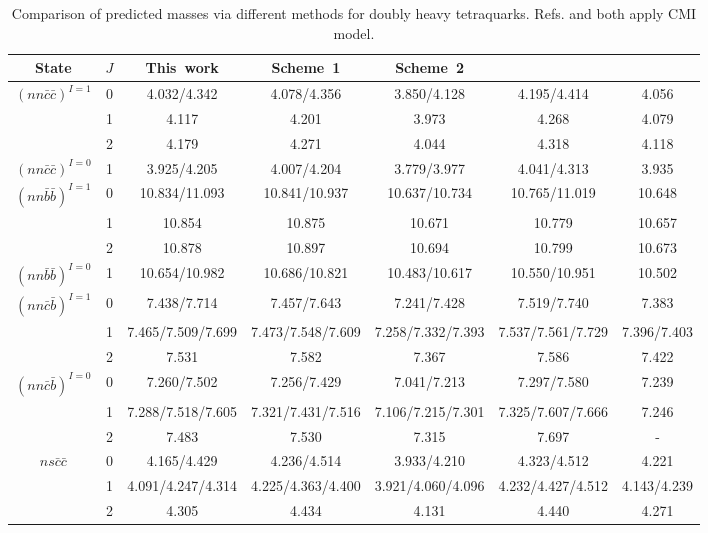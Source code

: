 \documentclass[12pt,onecolumn,floatfix,nofootinbib]{revtex4}
\begin{document}
\renewcommand{\tabcolsep}{0.06cm} \renewcommand{\arraystretch}{1.3}
\begin{table}[!htb]
\caption{Comparison of predicted masses via different methods for doubly heavy
tetraquarks. Refs.\protect\cite{Luo:2017eub} and \protect\cite{Lu:2020rog}
both apply CMI model.}
\label{tab:comparisonT}%
\begin{tabular}{ccccccc}
\hline\hline
\textrm{State} & $J$ & \textrm{This\ work} & \textrm{Scheme\ 1}\cite%
{Luo:2017eub} & \textrm{Scheme\ 2}\cite{Luo:2017eub} & \cite{Lu:2020rog} &
\cite{Ebert:2007rn} \\ \hline
${(nn\bar{c}\bar{c})}^{I=1}$ & 0 & 4.032/4.342 & 4.078/4.356 & 3.850/4.128 &
4.195/4.414 & 4.056 \\
& 1 & 4.117 & 4.201 & 3.973 & 4.268 & 4.079 \\
& 2 & 4.179 & 4.271 & 4.044 & 4.318 & 4.118 \\
${(nn\bar{c}\bar{c})}^{I=0}$ & 1 & 3.925/4.205 & 4.007/4.204 & 3.779/3.977 &
4.041/4.313 & 3.935 \\
${(nn\bar{b}\bar{b})}^{I=1}$ & 0 & 10.834/11.093 & 10.841/10.937 &
10.637/10.734 & 10.765/11.019 & 10.648 \\
& 1 & 10.854 & 10.875 & 10.671 & 10.779 & 10.657 \\
& 2 & 10.878 & 10.897 & 10.694 & 10.799 & 10.673 \\
${(nn\bar{b}\bar{b})}^{I=0}$ & 1 & 10.654/10.982 & 10.686/10.821 &
10.483/10.617 & 10.550/10.951 & 10.502 \\
${(nn\bar{c}\bar{b})}^{I=1}$ & 0 & 7.438/7.714 & 7.457/7.643 & 7.241/7.428 &
7.519/7.740 & 7.383 \\
& 1 & 7.465/7.509/7.699 & 7.473/7.548/7.609 & 7.258/7.332/7.393 &
7.537/7.561/7.729 & 7.396/7.403 \\
& 2 & 7.531 & 7.582 & 7.367 & 7.586 & 7.422 \\
${(nn\bar{c}\bar{b})}^{I=0}$ & 0 & 7.260/7.502 & 7.256/7.429 & 7.041/7.213 &
7.297/7.580 & 7.239 \\
& 1 & 7.288/7.518/7.605 & 7.321/7.431/7.516 & 7.106/7.215/7.301 &
7.325/7.607/7.666 & 7.246 \\
& 2 & 7.483 & 7.530 & 7.315 & 7.697 & - \\
$ns\bar{c}\bar{c}$ & 0 & 4.165/4.429 & 4.236/4.514 & 3.933/4.210 &
4.323/4.512 & 4.221 \\
& 1 & 4.091/4.247/4.314 & 4.225/4.363/4.400 & 3.921/4.060/4.096 &
4.232/4.427/4.512 & 4.143/4.239 \\
& 2 & 4.305 & 4.434 & 4.131 & 4.440 & 4.271 \\

\end{tabular}
\end{table}
\end{document}
